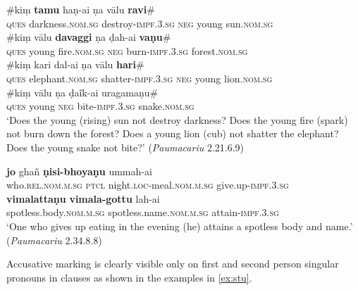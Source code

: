 \documentclass[output=paper,
modfonts
]{LSP/langsci}
\begin{document}
\begin{exe}
\ex\label{ex:mno}\gll \#kiṃ \textbf{tamu} haṇ-ai ṇa vālu \textbf{ravi}\#  \\
\textsc{ques} darkness.\textsc{nom.sg} destroy-\textsc{impf.3.sg} \textsc{neg}  young sun.\textsc{nom.sg} \\

\gll \#kiṃ vālu \textbf{davaggi} ṇa  ḍah-ai \textbf{vaṇu}\# \\
 \textsc{ques }  young fire.\textsc{nom.sg} \textsc{neg} burn-\textsc{impf.3.sg} forest.\textsc{nom.sg} \\

\gll \#kiṃ kari dal-ai ṇa vālu \textbf{hari}\# \\
\textsc{ques} elephant.\textsc{nom.sg}  shatter-\textsc{impf.3.sg} \textsc{neg} young lion.\textsc{nom.sg} \\

\gll  \#kiṃ vālu ṇa ḍaĩk-ai uragamaṇu\#   \\
\textsc{ques} young \textsc{neg} bite-\textsc{impf.3.sg} snake.\textsc{nom.sg} \\
\glt `Does the young (rising) sun not destroy darkness? Does the young fire (spark) not burn down the forest? Does a young lion (cub) not shatter the elephant? Does the young snake not bite?' (\textit{Paumacariu}  2.21.6.9)

\ex\label{ex:pqr}\gll \textbf{jo} ghañ \textbf{ṇisi-bhoyaṇu} ummah-ai\\
who.\textsc{rel.nom.m.sg} \textsc{ptcl} night.\textsc{loc}-meal.\textsc{nom.m.sg} give.up-\textsc{impf.3.sg}\\

\gll \textbf{vimalattaṇu} \textbf{vimala-gottu} lah-ai \\
spotless.body.\textsc{nom.m.sg} spotless.name.\textsc{nom.m.sg} attain-\textsc{impf.3.sg} \\
\glt `One who gives up eating in the evening (he) attains a spotless body and name.'  (\textit{Paumacariu} 2.34.8.8)
\end{exe}



Accusative marking is clearly visible only on first and second person singular pronouns in  clauses as shown in the examples in \cref{ex:stu}. 
\end{document}
